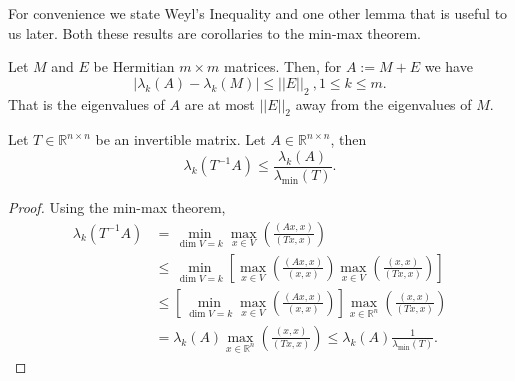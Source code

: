 \documentclass[review]{siamart251216}
\newcommand{\R}{{\mathbb{R}}}
\begin{document}
For convenience we state Weyl's Inequality and one other lemma that is useful to us later. Both these results are corollaries to the min-max theorem. 
\begin{lemma} \label{lemma:weyl} Let $M$ and $E$ be Hermitian $m \times m$ matrices. Then, for $A := M + E$ we have 
	$$ | \lambda_k(A) - \lambda_k(M) | \leq ||E||_2 \ , 1 \leq k \leq m.$$
	That is the eigenvalues of $A$ are at most $||E||_2$ away from the eigenvalues of $M$. 
\end{lemma}
\begin{lemma} \label{eig_lemma}
	Let $T \in \R^{n \times n}$ be an invertible matrix. Let $A \in \R^{n \times n}$, then $$\lambda_k(T^{-1}A) \leq \frac{\lambda_k(A)}{\lambda_{\min}(T)}.$$ 
\end{lemma}
\begin{proof}
	Using the min-max theorem, 
	\begin{align*}
		\lambda_k ( T^{-1} A) &= \min_{\dim V=k} \max_{x \in V} \left(  \frac{(Ax,x)}{(T x,x)}\right) \\
		&\leq   \min_{\dim V =k} \left[ \max_{x \in V} \left( \frac{(A x,x)}{(x,x)} \right)  \max_{x \in V} \left( \frac{(x,x)}{(T x,x)} \right) \right] \\
		&\leq \left[  \min_{\dim V =k}  \max_{x \in V} \left( \frac{(A x,x)}{(x,x)} \right)  \right] \max_{x \in \R^n} \left( \frac{(x,x)}{(T x,x)} \right)  \\
		&= \lambda_k(A)   \max_{x \in \R^n} \left( \frac{(x,x)}{(T x,x)} \right) \leq \lambda_k(A)  \frac{1}{\lambda_{\min}(T)}. 
	\end{align*}
\end{proof}
\end{document}
